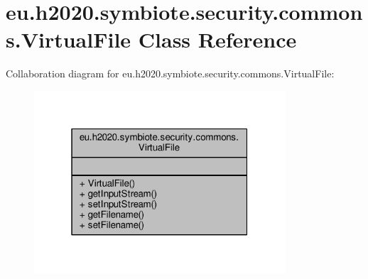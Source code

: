 \hypertarget{classeu_1_1h2020_1_1symbiote_1_1security_1_1commons_1_1VirtualFile}{}\section{eu.\+h2020.\+symbiote.\+security.\+commons.\+Virtual\+File Class Reference}
\label{classeu_1_1h2020_1_1symbiote_1_1security_1_1commons_1_1VirtualFile}


Collaboration diagram for eu.\+h2020.\+symbiote.\+security.\+commons.\+Virtual\+File\+:
\nopagebreak
\begin{figure}[H]
\begin{center}
\leavevmode
\includegraphics[width=265pt]{classeu_1_1h2020_1_1symbiote_1_1security_1_1commons_1_1VirtualFile__coll__graph}
\end{center}
\end{figure}
